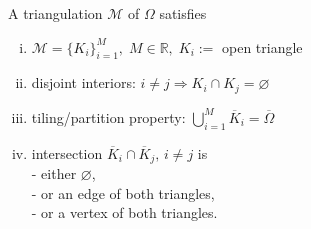 \begin{mdframed}[linecolor=blue,linewidth=.5pt,roundcorner=10pt]
	\begin{definition}[Triangulation]		
		A triangulation $\mathcal{M}$ of $\Omega$ satisfies 
		\begin{enumerate}[(i)]
			\item $\mathcal{M}=\{K_i\}_{i=1}^{M},\; M\in 
				\mathbb{R},\;K_i := $ open triangle
			\item disjoint interiors: $i\neq j \Rightarrow 
										K_i \cap K_j  = \varnothing$
			\item tiling/partition property: $ \displaystyle
				\bigcup_{i=1}^{M} \overline{K}_i=\overline{\Omega}$
			\item intersection $\overline{K}_i \cap \overline{K}_j,\,
			 	i\neq j$ is\\
					- either $\varnothing$,\\
					- or an edge of both triangles,\\
					- or a vertex of both triangles.
		\end{enumerate}
	\end{definition}
\end{mdframed}